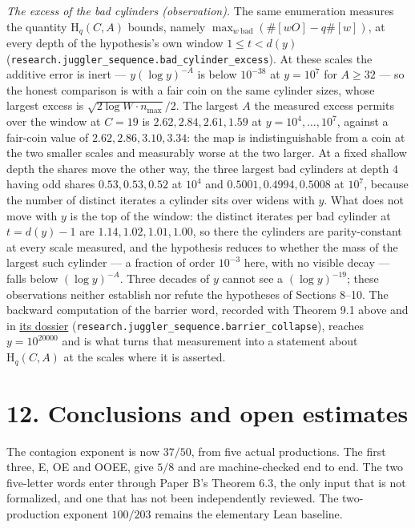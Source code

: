 \documentclass[11pt,a4paper]{article}
\begin{document}
\emph{The excess of the bad cylinders (observation).} The same
enumeration measures the quantity \(\mathrm H_q(C,A)\) bounds, namely
\(\max_{w\ \text{bad}}(\#[wO]-q\#[w])\), at every depth of the
hypothesis's own window \(1\le t<d(y)\)
(\texttt{\nolinkurl{research.juggler_sequence.bad_cylinder_excess}}). At
these scales the additive error is inert --- \(y(\log y)^{-A}\) is below
\(10^{-38}\) at \(y=10^7\) for \(A\ge32\) --- so the honest comparison
is with a fair coin on the same cylinder sizes, whose largest excess is
\(\sqrt{2\log W\cdot n_{\max}}/2\). The largest \(A\) the measured
excess permits over the window at \(C=19\) is \(2.62,2.84,2.61,1.59\) at
\(y=10^4,\dots,10^7\), against a fair-coin value of
\(2.62,2.86,3.10,3.34\): the map is indistinguishable from a coin at the
two smaller scales and measurably worse at the two larger. At a fixed
shallow depth the shares move the other way, the three largest bad
cylinders at depth \(4\) having odd shares \(0.53,0.53,0.52\) at
\(10^4\) and \(0.5001,0.4994,0.5008\) at \(10^7\), because the number of
distinct iterates a cylinder sits over widens with \(y\). What does not
move with \(y\) is the top of the window: the distinct iterates per bad
cylinder at \(t=d(y)-1\) are \(1.14,1.02,1.01,1.00\), so there the
cylinders are parity-constant at every scale measured, and the
hypothesis reduces to whether the mass of the largest such cylinder ---
a fraction of order \(10^{-3}\) here, with no visible decay --- falls
below \((\log y)^{-A}\). Three decades of \(y\) cannot see a
\((\log y)^{-19}\); these observations neither establish nor refute the
hypotheses of Sections 8--10. The backward computation of the barrier
word, recorded with Theorem 9.1 above and in
\href{https://github.com/sneakyweasel/btlab/blob/main/docs/problems/juggler_barrier_collapse.md}{its
dossier}
(\texttt{\nolinkurl{research.juggler_sequence.barrier_collapse}}),
reaches \(y=10^{20000}\) and is what turns that measurement into a
statement about \(\mathrm H_q(C,A)\) at the scales where it is asserted.

\section{12. Conclusions and open
estimates}\label{conclusions-and-open-estimates}

The contagion exponent is now \(37/50\), from five actual productions.
The first three, E, OE and OOEE, give \(5/8\) and are machine-checked
end to end. The two five-letter words enter through Paper B's Theorem
6.3, the only input that is not formalized, and one that has not been
independently reviewed. The two-production exponent \(100/203\) remains
the elementary Lean baseline.
\end{document}

